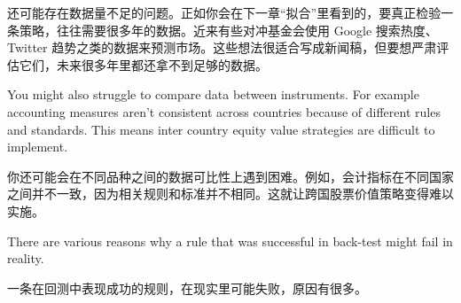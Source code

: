 \begin{chineseblock}还可能存在数据量不足的问题。正如你会在下一章“拟合”里看到的，要真正检验一条策略，往往需要很多年的数据。近来有些对冲基金会使用 Google 搜索热度、Twitter 趋势之类的数据来预测市场。这些想法很适合写成新闻稿，但要想严肃评估它们，未来很多年里都还拿不到足够的数据。\end{chineseblock}

\bipairgap

\begin{englishblock} You might also struggle to compare data between instruments. For example accounting measures aren't consistent across countries because of different rules and standards. This means inter country equity value strategies are difficult to implement. \end{englishblock}

\begin{chineseblock}你还可能会在不同品种之间的数据可比性上遇到困难。例如，会计指标在不同国家之间并不一致，因为相关规则和标准并不相同。这就让跨国股票价值策略变得难以实施。\end{chineseblock}



\begin{englishblock} There are various reasons why a rule that was successful in back-test might fail in reality. \end{englishblock}

\begin{chineseblock}一条在回测中表现成功的规则，在现实里可能失败，原因有很多。\end{chineseblock}


